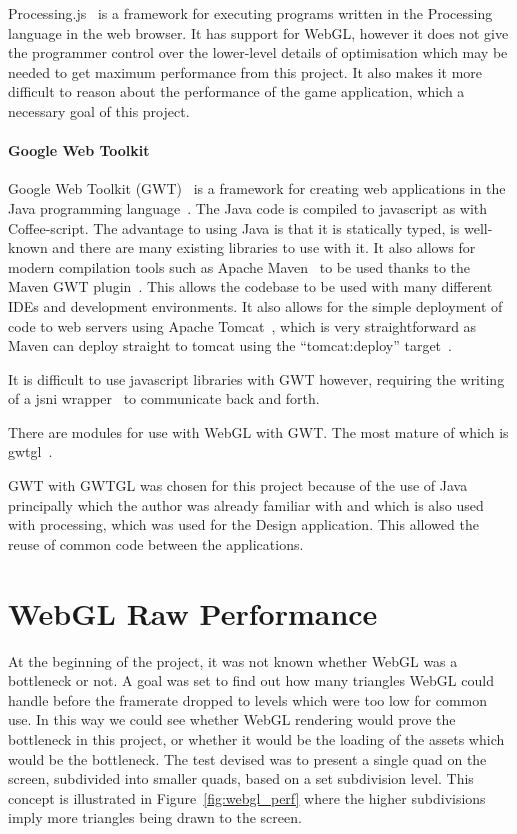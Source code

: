 Processing.js~\cite{web:processingjs} is a framework for executing programs written in the Processing~\cite{web:processing} language in the web browser.
It has support for WebGL, however it does not give the programmer control over the lower-level details of optimisation which may be needed to get maximum performance from this project.
It also makes it more difficult to reason about the performance of the game application, which a necessary goal of this project.

\paragraph{Google Web Toolkit}
Google Web Toolkit (GWT)~\cite{web:gwt} is a framework for creating web applications in the Java programming language~\cite{web:java}.
The Java code is compiled to javascript as with Coffee-script.
The advantage to using Java is that it is statically typed, is well-known and there are many existing libraries to use with it.
It also allows for modern compilation tools such as Apache Maven~\cite{web:Maven} to be used thanks to the Maven GWT plugin~\cite{web:mvngwtplugin}.
This allows the codebase to be used with many different IDEs and development environments.
It also allows for the simple deployment of code to web servers using Apache Tomcat~\cite{web:tomcat}, which is very straightforward as Maven can deploy straight to tomcat using the ``tomcat:deploy'' target~\cite{web:mvntomcatplugin}.

It is difficult to use javascript libraries with GWT however, requiring the writing of a jsni wrapper~\cite{web:jsni} to communicate back and forth.

There are modules for use with WebGL with GWT.
The most mature of which is gwtgl~\cite{web:gwtgl}.

GWT with GWTGL was chosen for this project because of the use of Java principally which the author was already familiar with and which is also used with processing, which was used for the Design application.
This allowed the reuse of common code between the applications.

\section{WebGL Raw Performance}
At the beginning of the project, it was not known whether WebGL was a bottleneck or not.
A goal was set to find out how many triangles WebGL could handle before the framerate dropped to levels which were too low for common use.
In this way we could see whether WebGL rendering would prove the bottleneck in this project, or whether it would be the loading of the assets which would be the bottleneck.
The test devised was to present a single quad on the screen, subdivided into smaller quads, based on a set subdivision level.
This concept is illustrated in Figure~\ref{fig:webgl_perf} where the higher subdivisions imply more triangles being drawn to the screen.

